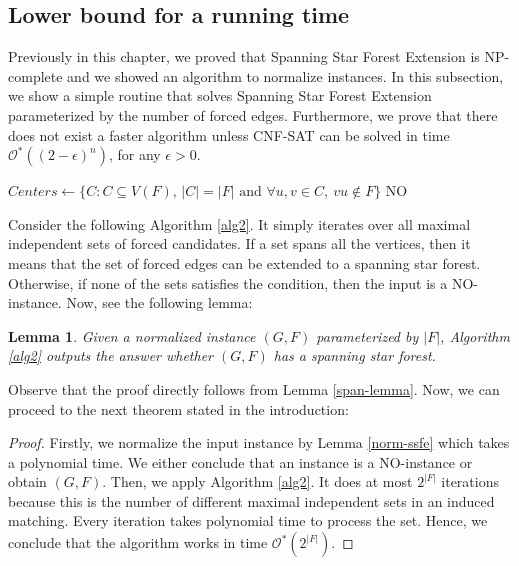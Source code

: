 \documentclass[en]{pracamgr}
\newtheorem{lemma}{Lemma}
\theoremstyle{definition}
\newcommand{\ssf}{spanning star forest}
\newcommand{\ssfep}{{\sc Spanning Star Forest Extension}}
\newcommand{\cnfsat}{{\sc CNF-SAT}}
\begin{document}
\subsection{Lower bound for a running time}

Previously in this chapter, we proved that \ssfep{} is NP-complete and we showed an algorithm to normalize instances. In this subsection, we show a simple routine that solves \ssfep{} parameterized by the number of forced edges. Furthermore, we prove that there does not exist a faster algorithm unless \cnfsat{} can be solved in time $\mathcal{O}^*((2-\epsilon)^n)$, for any $\epsilon>0$.

\begin{algorithm}\label{alg2}
	\KwResult{\ssf{} of $G$ extending $F$}
	$Centers \leftarrow \{C: C \subseteq V(F) \text{, }|C|=|F| \text{ and } \forall u,v \in C,\ vu \notin F\}$\;
	\Return NO\;
	\caption{Finding a spanning star forest in a normalized graph with forced edges.}
\end{algorithm}

Consider the following Algorithm \ref{alg2}. It simply iterates over all maximal independent sets of forced candidates. If a set spans all the vertices, then it means that the set of forced edges can be extended to a spanning star forest. Otherwise, if none of the sets satisfies the condition, then the input is a NO-instance. Now, see the following lemma:

\begin{lemma}\label{alg2-correctness}
	Given a normalized instance $(G,F)$ parameterized by $|F|$, Algorithm \ref{alg2} outputs the answer whether $(G,F)$ has a spanning star forest.
\end{lemma}

Observe that the proof directly follows from Lemma \ref{span-lemma}. Now, we can proceed to the next theorem stated in the introduction:

\thmssfepfetime*

\begin{proof}
	Firstly, we normalize the input instance by Lemma \ref{norm-ssfe} which takes a polynomial time. We either conclude that an instance is a NO-instance or obtain $(G,F)$. Then, we apply Algorithm \ref{alg2}. It does at most $2^{|F|}$ iterations because this is the number of different maximal independent sets in an induced matching. Every iteration takes polynomial time to process the set. Hence, we conclude that the algorithm works in time $\mathcal{O}^*(2^{|F|})$.
\end{proof}
\end{document}
